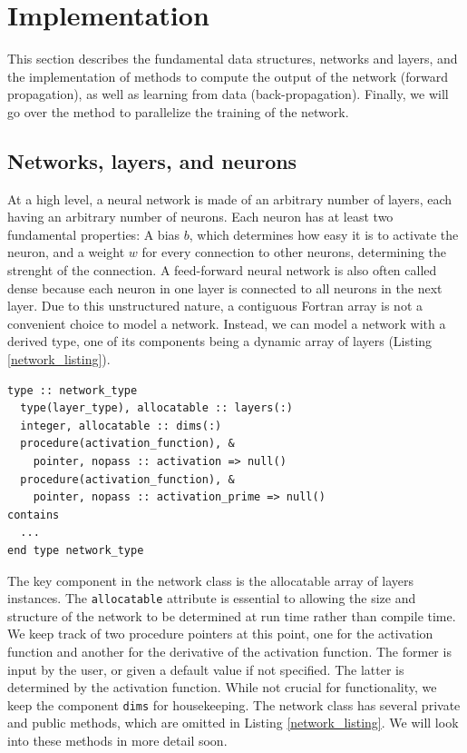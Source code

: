 \documentclass[sigplan, review=false, screen=true, balance=true]{acmart}
\begin{document}
\section{Implementation} \label{section_implementation}

This section describes the fundamental data structures, networks and layers,
and the implementation of methods to compute the output of the network
(forward propagation), as well as learning from data (back-propagation).
Finally, we will go over the method to parallelize the training of the network.

\subsection{Networks, layers, and neurons}

At a high level, a neural network is made of an arbitrary number of layers,
each having an arbitrary number of neurons. Each neuron has at least two
fundamental properties: A bias $b$, which determines how easy it is to activate
the neuron, and a weight $w$ for every connection to other neurons, determining
the strenght of the connection. A feed-forward neural network is also often
called dense because each neuron in one layer is connected to all neurons in
the next layer. Due to this unstructured nature, a contiguous Fortran array is
not a convenient choice to model a network. Instead, we can model a network
with a derived type, one of its components being a dynamic array of layers
(Listing \ref{network_listing}).

\begin{lstlisting}[caption={Definition of the network class. Type-bound methods are omitted for brevity.}, captionpos=b, label={network_listing}]
type :: network_type
  type(layer_type), allocatable :: layers(:)
  integer, allocatable :: dims(:)
  procedure(activation_function), &
    pointer, nopass :: activation => null()
  procedure(activation_function), &
    pointer, nopass :: activation_prime => null()
contains
  ...
end type network_type
\end{lstlisting}

The key component in the network class is the allocatable array of layers
instances. The \lstinline{allocatable} attribute is essential to allowing the
size and structure of the network to be determined at run time rather than compile time.
We keep track of two procedure pointers at this point, one for the activation
function and another for the derivative of the activation function. The former
is input by the user, or given a default value if not specified. The latter is
determined by the activation function. While not crucial for functionality,
we keep the component \lstinline{dims} for housekeeping.
The network class has several private and public methods, which are omitted in
Listing \ref{network_listing}. We will look into these methods in more detail
soon.
\end{document}
